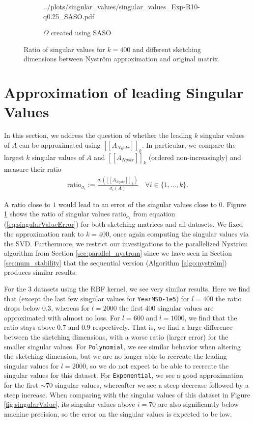 \documentclass{article}
\theoremstyle{definition}
\begin{document}
\begin{figure}
\begin{subfigure}[t]{0.4\textwidth}
        {../plots/singular_values/singular_values_Exp-R10-q0.25_SASO.pdf}
    \caption{$\Omega$ created using SASO}
\end{subfigure}\hfill
\caption{Ratio of singular values for $k=400$ and different sketching dimensions
between Nyström approximation and original matrix.}
\label{fig:singularValueRatios}
\end{figure}

\section{Approximation of leading Singular Values}

In this section, we address the question of whether the leading $k$ singular
values of $A$ can be approximated using $[\![A_{Nystr}]\!]_k$. In particular, we
compare the largest $k$ singular values of $A$ and $[\![A_{Nystr}]\!]_k$
(ordered non-increasingly) and measure their ratio
\begin{align}
    \label{eq:singularValueError}
    \text{ratio}_{\sigma_i} := \frac{\sigma_i([\![A_{Nystr}]\!]_k)}{\sigma_i(A)}
    \quad \forall i \in \{1,...,k\}.
\end{align}

A ratio close to $1$ would lead to an error of the singular values close to $0$.
Figure \ref{fig:singularValueRatios} shows the ratio of singular values
$\text{ratio}_{\sigma_i}$ from equation (\ref{eq:singularValueError}) for both
sketching matrices and all datasets. We fixed the approximation rank to $k=400$,
once again computing the singular values via the SVD. Furthermore, we restrict
our investigations to the parallelized Nyström algorithm from Section
\ref{sec:parallel_nystrom} since we have seen in Section \ref{sec:num_stability}
that the sequential version (Algorithm \ref{algo:nyström}) produces similar
results.

For the 3 datasets using the RBF kernel, we see very similar results. Here we
find that (except the last few singular values for \texttt{YearMSD-1e5}) for
$l=400$ the ratio drops below $0.3$, whereas for $l=2000$ the first $400$
singular values are approximated with almost no loss. For $l=600$ and $l=1000$,
we find that the ratio stays above $0.7$ and $0.9$ respectively. That is, we
find a large difference between the sketching dimensions, with a worse ratio
(larger error) for the smaller singular values. For \texttt{Polynomial}, we see
similar behavior when altering the sketching dimension, but we are no longer
able to recreate the leading singular values for $l=2000$, so we do not expect
to be able to recreate the singular values for this dataset. For
\texttt{Exponential}, we see a good approximation for the first $\sim 70$
singular values, whereafter we see a steep decrease followed by a steep
increase. When comparing with the singular values of this dataset in Figure
\ref{fig:singularValue}, its singular values above $i=70$ are also significantly
below machine precision, so the error on the singular values is expected to be
low. \newline
\end{document}
